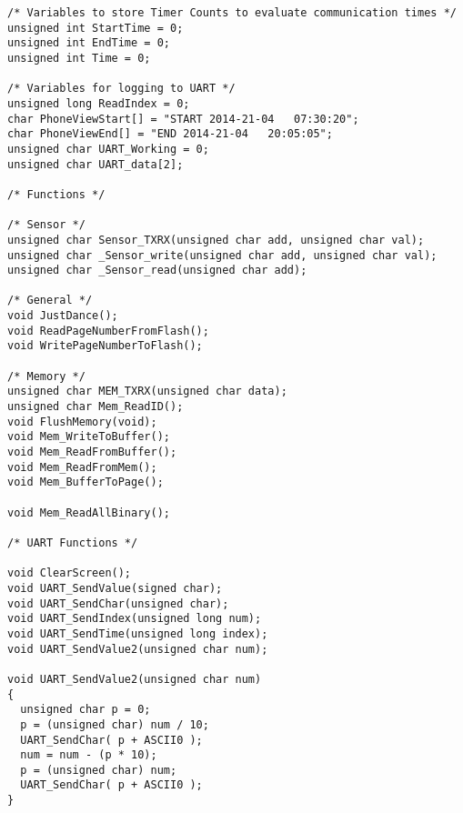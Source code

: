 \begin{lstlisting}[caption=main.h,label=Code1]
/* Variables to store Timer Counts to evaluate communication times */
unsigned int StartTime = 0;
unsigned int EndTime = 0;
unsigned int Time = 0;

/* Variables for logging to UART */
unsigned long ReadIndex = 0;
char PhoneViewStart[] = "START 2014-21-04   07:30:20";
char PhoneViewEnd[] = "END 2014-21-04   20:05:05";
unsigned char UART_Working = 0;
unsigned char UART_data[2];

/* Functions */

/* Sensor */
unsigned char Sensor_TXRX(unsigned char add, unsigned char val);
unsigned char _Sensor_write(unsigned char add, unsigned char val);
unsigned char _Sensor_read(unsigned char add);

/* General */
void JustDance();
void ReadPageNumberFromFlash();
void WritePageNumberToFlash();

/* Memory */
unsigned char MEM_TXRX(unsigned char data);
unsigned char Mem_ReadID();
void FlushMemory(void);
void Mem_WriteToBuffer();
void Mem_ReadFromBuffer();
void Mem_ReadFromMem();
void Mem_BufferToPage();

void Mem_ReadAllBinary();

/* UART Functions */

void ClearScreen();
void UART_SendValue(signed char);
void UART_SendChar(unsigned char);
void UART_SendIndex(unsigned long num);
void UART_SendTime(unsigned long index);
void UART_SendValue2(unsigned char num);

void UART_SendValue2(unsigned char num)
{
  unsigned char p = 0;
  p = (unsigned char) num / 10;
  UART_SendChar( p + ASCII0 );
  num = num - (p * 10);
  p = (unsigned char) num;
  UART_SendChar( p + ASCII0 );  
}
\end{lstlisting}
\pagebreak
